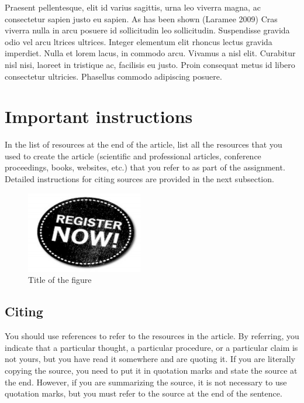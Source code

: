 \documentclass{comjnl}
\begin{document}
\label{Sec:Sklicnapodpoglavje}

Praesent pellentesque, elit id varius sagittis, urna leo viverra magna, ac consectetur sapien justo eu sapien. As has been shown (Laramee 2009) Cras viverra nulla in arcu posuere id sollicitudin leo sollicitudin. Suspendisse gravida odio vel arcu ltrices ultrices. Integer elementum elit rhoncus lectus gravida imperdiet. Nulla et lorem lacus, in commodo arcu. Vivamus a nisl elit. Curabitur nisl nisi, laoreet in tristique ac, facilisis eu justo. Proin consequat metus id libero consectetur ultricies. Phasellus commodo adipiscing posuere.

\section{Important instructions} 

In the list of resources at the end of the article, list all the resources that you used to create the article (scientific and professional articles, conference proceedings, books, websites, etc.) that you refer to as part of the assignment. Detailed instructions for citing sources are provided in the next subsection.

\begin{figure}[b]
\centering
\includegraphics[width=2in]{registracija}
\caption{Title of the figure \cite{Mick1986}}\label{fig:registracija}
\end{figure}

\subsection{Citing}

You should use references to refer to the resources in the article. By referring, you indicate that a particular thought, a particular procedure, or a particular claim is not yours, but you have read it somewhere and are quoting it. If you are literally copying the source, you need to put it in quotation marks and state the source at the end. However, if you are summarizing the source, it is not necessary to use quotation marks, but you must refer to the source at the end of the sentence.
\end{document}

